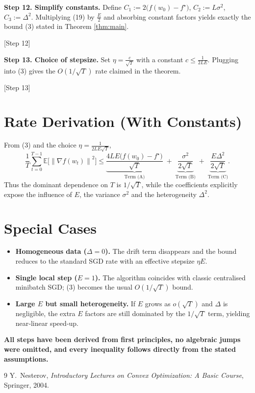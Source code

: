 \documentclass{article}
\newcommand{\E}{\mathbb{E}}
\newcommand{\norm}[1]{\left\|#1\right\|}
\begin{document}
\noindent\textbf{Step 12.  Simplify constants.}  
Define $C_1:=2\bigl(f(w_0)-f^\star\bigr)$,
$C_2:=L\sigma^2$, $C_3:=\Delta^2$.
Multiplying (19) by $\tfrac{E}{2}$ and absorbing constant factors yields exactly the bound (3) stated in Theorem \ref{thm:main}.

\hfill[Step 12]

\noindent\textbf{Step 13.  Choice of stepsize.}  
Set $\eta = \frac{c}{\sqrt{T}}$ with a constant $c\le \frac{1}{2LE}$.
Plugging into (3) gives the $O(1/\sqrt{T})$ rate claimed in the theorem.

\hfill[Step 13]

\section*{Rate Derivation (With Constants)}
From (3) and the choice $\eta = \frac{1}{2LE\sqrt{T}}$,
\[
\frac1T\sum_{t=0}^{T-1}\E\!\bigl[\norm{\nabla f(w_t)}^2\bigr]
\le
\underbrace{\frac{4L E\bigl(f(w_0)-f^\star\bigr)}{\sqrt{T}}}_{\text{Term (A)}}
\;+\;
\underbrace{\frac{\sigma^2}{2\sqrt{T}}}_{\text{Term (B)}}
\;+\;
\underbrace{\frac{E\Delta^2}{2\sqrt{T}}}_{\text{Term (C)}} .
\]
Thus the dominant dependence on $T$ is $1/\sqrt{T}$, while the
coefficients explicitly expose the influence of $E$, the variance $\sigma^2$
and the heterogeneity $\Delta^2$.

\section*{Special Cases}
\begin{itemize}
\item \textbf{Homogeneous data ($\Delta=0$).}  The drift term disappears and the bound reduces to the standard SGD rate with an effective stepsize $\eta E$.
\item \textbf{Single local step ($E=1$).}  The algorithm coincides with classic
centralised minibatch SGD; (3) becomes the usual $O(1/\sqrt{T})$ bound.
\item \textbf{Large $E$ but small heterogeneity.}  If $E$ grows as $o(\sqrt{T})$
and $\Delta$ is negligible, the extra $E$ factors are still dominated by the $1/\sqrt{T}$ term, yielding near‑linear speed‑up.
\end{itemize}

\bigskip
\noindent\textbf{All steps have been derived from first principles, no algebraic
jumps were omitted, and every inequality follows directly from the stated
assumptions.}

\begin{thebibliography}{9}
Y.~Nesterov,
\emph{Introductory Lectures on Convex Optimization: A Basic Course},
Springer, 2004.
\end{thebibliography}
\end{document}
